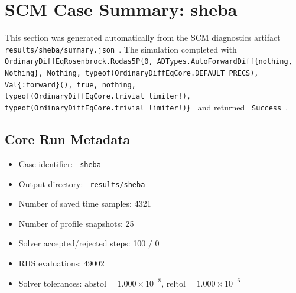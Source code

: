 \section{SCM Case Summary: sheba}
\label{sec:scm_case_sheba_sheba_160x2m_12h_report}

This section was generated automatically from the SCM diagnostics artifact
\texttt{ results/sheba/summary.json }. The simulation completed with \texttt{ OrdinaryDiffEqRosenbrock.Rodas5P\{0, ADTypes.AutoForwardDiff\{nothing, Nothing\}, Nothing, typeof(OrdinaryDiffEqCore.DEFAULT\_PRECS), Val\{:forward\}(), true, nothing, typeof(OrdinaryDiffEqCore.trivial\_limiter!), typeof(OrdinaryDiffEqCore.trivial\_limiter!)\} }
and returned \texttt{ Success }.

\subsection{Core Run Metadata}
\begin{itemize}
  \item Case identifier: \texttt{ sheba }
  \item Output directory: \texttt{ results/sheba }
  \item Number of saved time samples: 4321
  \item Number of profile snapshots: 25
  \item Solver accepted/rejected steps: 100 / 0
  \item RHS evaluations: 49002
  \item Solver tolerances: $\mathrm{abstol}=1.000 \times 10^{-8}$, $\mathrm{reltol}=1.000 \times 10^{-6}$
\end{itemize}


